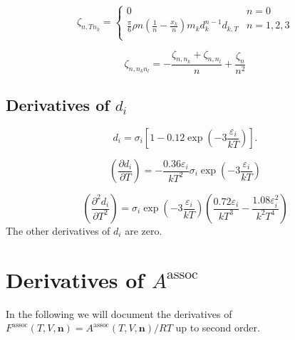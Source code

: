 \documentclass[internal,english]{sintefmemo2012}
\newcommand{\mbf}[0]{\mathbf}
\newcommand*{\pder}[2]{\left(\frac{\partial #1}{\partial #2}\right)}
\newcommand*{\pdder}[2]{\left(\frac{\partial^2 #1}{\partial #2^2}\right)}
\newcommand{\z}{\zeta}
\newcommand{\lp}{\left(}
\newcommand{\rp}{\right)}
\begin{document}
\begin{equation}
  \z_{n,T n_k} = \begin{cases}
    0 & n = 0 \\ 
    \frac{\pi}{6} \rho n \lp \frac{1}{n} - \frac{x_k}{n} \rp m_k d_k^{n-1} d_{k,T} & n = 1,2,3 \\
  \end{cases}
\end{equation}

\begin{equation}
  \z_{n, n_k n_l} = - \frac{\z_{n,n_k}+\z_{n,n_l}}{n} + \frac{\z_n}{n^2}
\end{equation}

\subsection{Derivatives of $d_i$}
\begin{equation}
  d_i = \sigma_i \left[1 - 0.12\exp \lp -3\frac{\varepsilon_i}{kT} \rp \right].
\end{equation}

\begin{equation}
  \pder{d_i}{T} = -\frac{0.36\varepsilon_i}{kT^2} \sigma_i \exp \lp -3\frac{\varepsilon_i}{kT} \rp
\end{equation}

\begin{equation}
  \pdder{d_i}{T} = \sigma_i \exp \lp -3\frac{\varepsilon_i}{kT} \rp \lp \frac{0.72 \varepsilon_i}{kT^3} - \frac{1.08 \varepsilon_i^2}{k^2T^4}\rp
\end{equation}
The other derivatives of $d_i$ are zero.

\section{Derivatives of $A^{\textrm{assoc}}$}
In the following we will document the derivatives of $F^{\text{assoc}}(T,V,\mbf n)=A^{\textrm{assoc}}(T,V,\mbf n)/RT$ up to second order.
\end{document}
